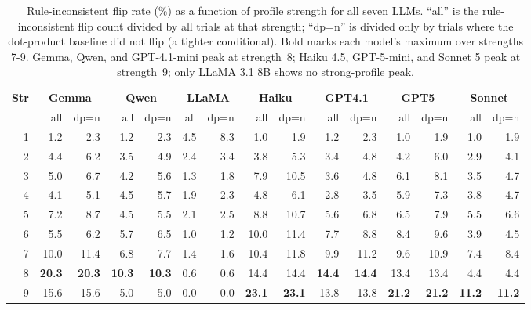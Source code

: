 \begin{table}[t]
\centering
\small
\setlength{\tabcolsep}{5pt}
{%
\begin{tabular}{rrrrrrrrrrrrrrr}
\hline
\textbf{Str} & \multicolumn{2}{c}{\textbf{Gemma}} & \multicolumn{2}{c}{\textbf{Qwen}} & \multicolumn{2}{c}{\textbf{LLaMA}} & \multicolumn{2}{c}{\textbf{Haiku}} & \multicolumn{2}{c}{\textbf{GPT4.1}} & \multicolumn{2}{c}{\textbf{GPT5}} & \multicolumn{2}{c}{\textbf{Sonnet}} \\
& all & dp=n & all & dp=n & all & dp=n & all & dp=n & all & dp=n & all & dp=n & all & dp=n \\
\hline
1 &  1.2 &  2.3 &  1.2 &  2.3 &  4.5 &  8.3 &  1.0 &  1.9 &  1.2 &  2.3 &  1.0 &  1.9 &  1.0 &  1.9 \\
2 &  4.4 &  6.2 &  3.5 &  4.9 &  2.4 &  3.4 &  3.8 &  5.3 &  3.4 &  4.8 &  4.2 &  6.0 &  2.9 &  4.1 \\
3 &  5.0 &  6.7 &  4.2 &  5.6 &  1.3 &  1.8 &  7.9 & 10.5 &  3.6 &  4.8 &  6.1 &  8.1 &  3.5 &  4.7 \\
4 &  4.1 &  5.1 &  4.5 &  5.7 &  1.9 &  2.3 &  4.8 &  6.1 &  2.8 &  3.5 &  5.9 &  7.3 &  3.8 &  4.7 \\
5 &  7.2 &  8.7 &  4.5 &  5.5 &  2.1 &  2.5 &  8.8 & 10.7 &  5.6 &  6.8 &  6.5 &  7.9 &  5.5 &  6.6 \\
6 &  5.5 &  6.2 &  5.7 &  6.5 &  1.0 &  1.2 & 10.0 & 11.4 &  7.7 &  8.8 &  8.4 &  9.6 &  3.9 &  4.5 \\
7 & 10.0 & 11.4 &  6.8 &  7.7 &  1.4 &  1.6 & 10.4 & 11.8 &  9.9 & 11.2 &  9.6 & 10.9 &  7.4 &  8.4 \\
8 & \textbf{20.3} & \textbf{20.3} & \textbf{10.3} & \textbf{10.3} &  0.6 &  0.6 & 14.4 & 14.4 & \textbf{14.4} & \textbf{14.4} & 13.4 & 13.4 &  4.4 &  4.4 \\
9 & 15.6 & 15.6 &  5.0 &  5.0 &  0.0 &  0.0 & \textbf{23.1} & \textbf{23.1} & 13.8 & 13.8 & \textbf{21.2} & \textbf{21.2} & \textbf{11.2} & \textbf{11.2} \\
\hline
\end{tabular}
}
\caption{Rule-inconsistent flip rate (\%) as a function of profile strength for all seven LLMs. ``all'' is the rule-inconsistent flip count divided by all trials at that strength; ``dp=n'' is divided only by trials where the dot-product baseline did not flip (a tighter conditional). Bold marks each model's maximum over strengths 7-9. Gemma, Qwen, and GPT-4.1-mini peak at strength~8; Haiku 4.5, GPT-5-mini, and Sonnet 5 peak at strength~9; only LLaMA 3.1 8B shows no strong-profile peak.}
\label{tab:impossible}
\end{table}


